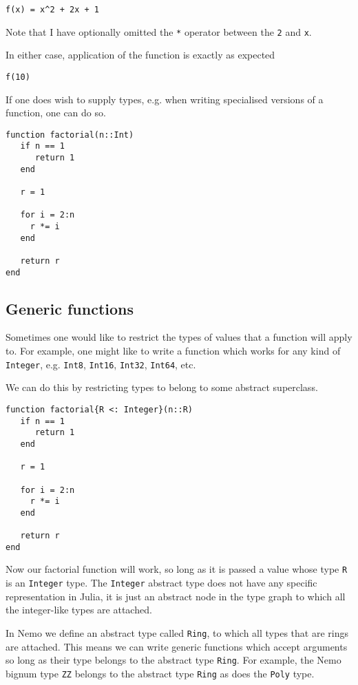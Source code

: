 \documentclass[a4paper,10pt]{article}
\newcommand{\code}{\lstinline}
\begin{document}
{\begin{lstlisting}
f(x) = x^2 + 2x + 1
\end{lstlisting}

Note that I have optionally omitted the \code{*} operator between the \code{2} and \code{x}.

In either case, application of the function is exactly as expected

\begin{lstlisting}
f(10)
\end{lstlisting}

If one does wish to supply types, e.g. when writing specialised versions of a function, one
can do so.

\begin{lstlisting}
function factorial(n::Int)
   if n == 1
      return 1
   end

   r = 1
   
   for i = 2:n
     r *= i
   end

   return r  
end
\end{lstlisting}

\subsection{Generic functions}

Sometimes one would like to restrict the types of values that a function will apply to. For
example, one might like to write a function which works for any kind of \code{Integer}, e.g.
\code{Int8}, \code{Int16}, \code{Int32}, \code{Int64}, etc.

We can do this by  restricting types to belong to some abstract superclass.

\begin{lstlisting}
function factorial{R <: Integer}(n::R)
   if n == 1
      return 1
   end

   r = 1
   
   for i = 2:n
     r *= i
   end

   return r  
end
\end{lstlisting}

Now our factorial function will work, so long as it is passed a value whose type \code{R} is
an \code{Integer} type. The \code{Integer} abstract type does not have any specific
representation in Julia, it is just an abstract node in the type graph to which all the
integer-like types are attached.

In Nemo we define an abstract type called \code{Ring}, to which all types that are rings
are attached. This means we can write generic functions which accept arguments so long as
their type belongs to the abstract type \code{Ring}. For example, the Nemo bignum type
\code{ZZ} belongs to the abstract type \code{Ring} as does the \code{Poly} type.

}
\end{document}
